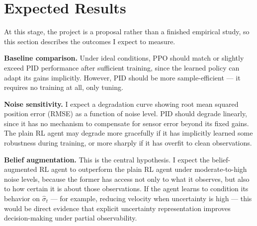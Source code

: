 \documentclass[11pt]{article}
\begin{document}

\section*{Expected Results}

At this stage, the project is a proposal rather than a finished empirical study, so this section describes the outcomes I expect to measure.

\textbf{Baseline comparison.} Under ideal conditions, PPO should match or slightly exceed PID performance after sufficient training, since the learned policy can adapt its gains implicitly. However, PID should be more sample-efficient — it requires no training at all, only tuning.

\textbf{Noise sensitivity.} I expect a degradation curve showing root mean squared position error (RMSE) as a function of noise level. PID should degrade linearly, since it has no mechanism to compensate for sensor error beyond its fixed gains. The plain RL agent may degrade more gracefully if it has implicitly learned some robustness during training, or more sharply if it has overfit to clean observations.

\textbf{Belief augmentation.} This is the central hypothesis. I expect the belief-augmented RL agent to outperform the plain RL agent under moderate-to-high noise levels, because the former has access not only to what it observes, but also to how certain it is about those observations. If the agent learns to condition its behavior on $\hat{\sigma}_t$ — for example, reducing velocity when uncertainty is high — this would be direct evidence that explicit uncertainty representation improves decision-making under partial observability.
\end{document}

